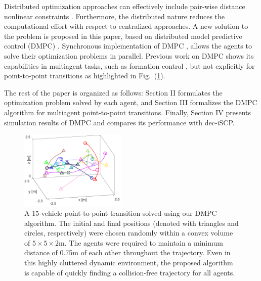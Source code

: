 Distributed optimization approaches can effectively include pair-wise distance nonlinear constraints \cite{bhattacharya2011distributed}. Furthermore, the distributed nature reduces the computational effort with respect to centralized approaches. A new solution to the problem is proposed in this paper, based on distributed model predictive control (DMPC) \cite{camponogara2002distributed}. Synchronous implementation of DMPC \cite{dai2017distributed,wang2014synthesis}, allows the agents to solve their optimization problems in parallel. Previous work on DMPC shows its capabilities in multiagent tasks, such as formation control \cite{van2017distributed,sayyaadi2017decentralized}, but not explicitly for point-to-point transitions as highlighted in Fig.~(\ref{fig:30_random}).

The rest of the paper is organized as follows: Section II formulates the optimization problem solved by each agent, and Section III formalizes the DMPC algorithm for multiagent point-to-point transitions. Finally, Section IV presents simulation results of DMPC and compares its performance with dec-iSCP.

\begin{figure}[t]
	\centering
	\includegraphics[width=0.45\textwidth]{figures/30_rand}
	\caption{A 15-vehicle point-to-point transition solved using our DMPC algorithm. The initial and final positions (denoted with triangles and circles, respectively) were chosen randomly within a convex volume of $5 \times 5 \times 2$m. The agents were required to maintain a minimum distance of 0.75m of each other throughout the trajectory. Even in this highly cluttered dynamic environment, the proposed algorithm is capable of quickly finding a collision-free trajectory for all agents.}
	\label{fig:30_random}
\end{figure}






